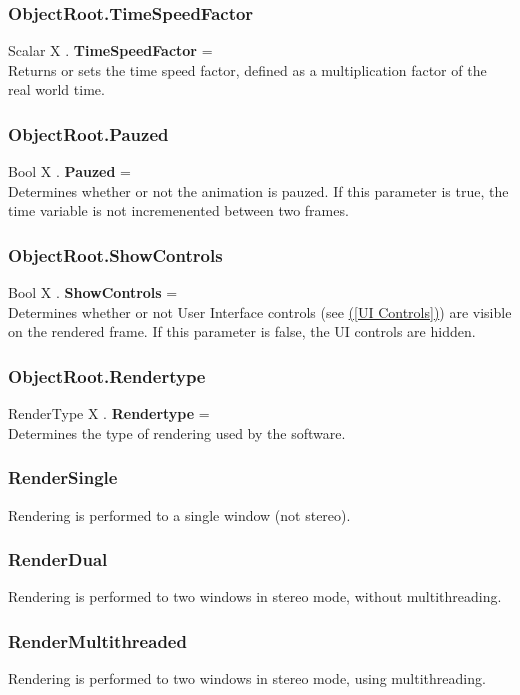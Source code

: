 \documentclass[10pt]{book}
\newcommand{\linkitem}[1]{\hyperref[#1]{\nameref{#1} (\ref{#1})}}
\begin{document}
\subsubsection{ObjectRoot.TimeSpeedFactor \label{F:ObjectRoot:TimeSpeedFactor}}
Scalar X . \textbf{TimeSpeedFactor} = \\
Returns or sets the time speed factor, defined as a multiplication factor of the real world time.

\subsubsection{ObjectRoot.Pauzed \label{F:ObjectRoot:Pauzed}}
Bool X . \textbf{Pauzed} = \\
Determines whether or not the animation is pauzed. If this parameter is true, the time variable is not incremenented between two frames.

\subsubsection{ObjectRoot.ShowControls \label{F:ObjectRoot:ShowControls}}
Bool X . \textbf{ShowControls} = \\
Determines whether or not User Interface controls (see \linkitem{UI Controls}) are visible on the rendered frame. If this parameter is false, the UI controls are hidden.

\subsubsection{ObjectRoot.Rendertype \label{F:ObjectRoot:Rendertype}}
RenderType X . \textbf{Rendertype} = \\
Determines the type of rendering used by the software.

\subsubsection{RenderSingle \label{T:RenderType|RenderSingle}}
Rendering is performed to a single window (not stereo).

\subsubsection{RenderDual \label{T:RenderType|RenderDual}}
Rendering is performed to two windows in stereo mode, without multithreading.

\subsubsection{RenderMultithreaded \label{T:RenderType|RenderMultithreaded}}
Rendering is performed to two windows in stereo mode, using multithreading.
\end{document}
